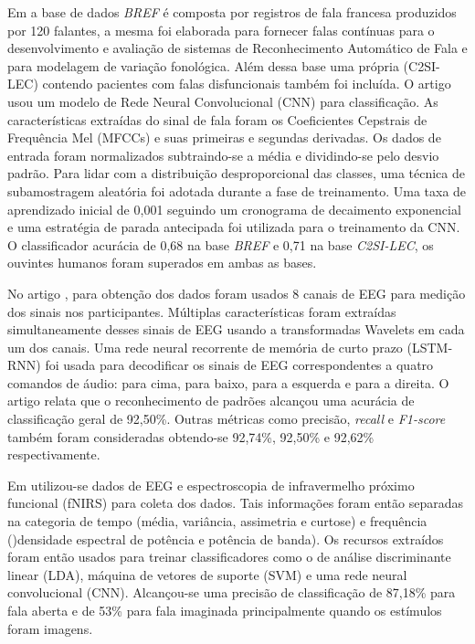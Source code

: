 \documentclass[a4paper,12pt,openright,oneside]{book}
\newenvironment{myenv}[1]
  {\begin{spacing}{#1}}
  {\end{spacing}}
\begin{document}
\begin{myenv}{1.5}
			\par Em \cite{abderrazek20_interspeech} a base de dados \textit{BREF} é composta por registros de fala francesa produzidos por 120 falantes, a mesma foi elaborada para fornecer falas contínuas para o desenvolvimento e avaliação de sistemas de Reconhecimento Automático de Fala e para modelagem de variação fonológica. Além dessa base uma própria (C2SI-LEC) contendo pacientes com falas disfuncionais também foi incluída. O artigo usou um modelo de Rede Neural Convolucional (CNN) para classificação. As características extraídas do sinal de fala foram os Coeficientes Cepstrais de Frequência Mel (MFCCs) e suas primeiras e segundas derivadas. Os dados de entrada foram normalizados subtraindo-se a média e dividindo-se pelo desvio padrão. Para lidar com a distribuição desproporcional das classes, uma técnica de subamostragem aleatória foi adotada durante a fase de treinamento. Uma taxa de aprendizado inicial de 0,001 seguindo um cronograma de decaimento exponencial e uma estratégia de parada antecipada foi utilizada para o treinamento da CNN. O classificador acurácia de 0,68 na base \textit{BREF} e 0,71 na base \textit{C2SI-LEC}, os ouvintes humanos foram superados em ambas as bases.\newline
			
			\par No artigo \cite{pawar2022wavelet}, para obtenção dos dados foram usados 8 canais de EEG para medição dos sinais nos participantes. Múltiplas características foram extraídas simultaneamente desses sinais de EEG usando a transformadas Wavelets em cada um dos canais. Uma rede neural recorrente de memória de curto prazo (LSTM-RNN) foi usada para decodificar os sinais de EEG correspondentes a quatro comandos de áudio: para cima, para baixo, para a esquerda e para a direita. O artigo relata que o reconhecimento de padrões alcançou uma acurácia de classificação geral de 92,50\%. Outras métricas como precisão, \textit{recall} e \textit{F1-score} também foram consideradas obtendo-se 92,74\%, 92,50\% e 92,62\% respectivamente.\newline
			
			\par Em \cite{cooney2021bimodal} utilizou-se dados de EEG e espectroscopia de infravermelho próximo funcional (fNIRS) para coleta dos dados. Tais informações foram então separadas na categoria de tempo (média, variância, assimetria e curtose) e frequência ()densidade espectral de potência e potência de banda). Os recursos extraídos foram então usados para treinar classificadores como o de análise discriminante linear (LDA), máquina de vetores de suporte (SVM) e uma rede neural convolucional (CNN). Alcançou-se uma precisão de classificação de 87,18\% para fala aberta e de 53\% para fala imaginada principalmente quando os estímulos foram imagens.\newline
			

\end{myenv}
\end{document}
